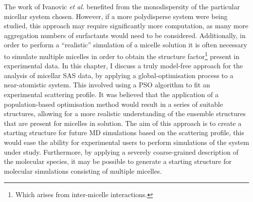 The work of Ivanovic \emph{et al.} benefited from the monodispersity of the particular micellar system chosen.
However, if a more polydisperse system were being studied, this approach may require significantly more computation, as many more aggregation numbers of surfactants would need to be considered.
Additionally, in order to perform a ``realistic'' simulation of a micelle solution it is often necessary to simulate multiple micelles in order to obtain the structure factor\footnote{Which arises from inter-micelle interactions.} present in experimental data.
In this chapter, I discuss a truly model-free approach for the analysis of micellar SAS data, by applying a global-optimisation process to a near-atomistic system.
This involved using a PSO algorithm to fit an experimental scattering profile.
It was believed that the application of a population-based optimisation method would result in a series of suitable structures, allowing for a more realistic understanding of the ensemble structures that are present for micelles in solution.
The aim of this approach is to create a starting structure for future MD simulations based on the scattering profile, this would ease the ability for experimental users to perform simulations of the system under study.
Furthermore, by applying a severely coarse-grained description of the molecular species, it may be possible to generate a starting structure for molecular simulations consisting of multiple micelles.
